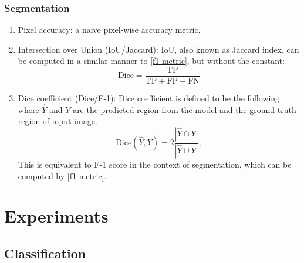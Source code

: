\documentclass[review]{cvpr}
\begin{document}
\subsubsection{Segmentation}
\begin{enumerate}
    \item[\textbullet] Pixel accuracy: a naive pixel-wise accuracy metric. 
    \item[\textbullet] Intersection over Union (IoU/Jaccard): IoU, also known as Jaccard index, can be computed in a similar manner to \ref{f1-metric}, but without the constant:
    \begin{equation}
        \text{Dice} = \frac{\text{TP}}{\text{TP}+\text{FP}+ \text{FN}}
        \label{dice-score-metric}
    \end{equation}
    \item[\textbullet] Dice coefficient (Dice/F-1): Dice coefficient is defined to be the following where $\hat{Y}$ and $Y$ are the predicted region from the model and the ground truth region of input image.
    \begin{equation}
        \text{Dice} (\hat{Y},Y)=2\frac{|\hat{Y} \cap Y|}{|\hat{Y} \cup Y|},
        \label{dice-score}
    \end{equation}
    This is equivalent to F-1 score in the context of segmentation, which can be computed by \ref{f1-metric}.
\end{enumerate}


\section{Experiments}
\subsection{Classification}
\end{document}

